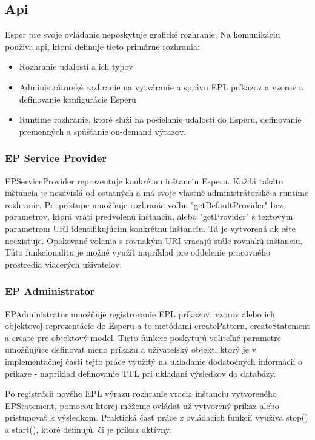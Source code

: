 	\subsection{Api}
		Esper pre svoje ovládanie neposkytuje grafické rozhranie. Na komunikáciu používa api, ktorá definuje tieto primárne rozhrania:
		\begin{itemize}
			\item Rozhranie udalostí a ich typov
			\item Administrátorské rozhranie na vytváranie a správu EPL príkazov a vzorov a definovanie konfigurácie Esperu
			\item Runtime rozhranie, ktoré slúži na posielanie udalostí do Esperu, definovanie premenných a spúšťanie on-demand výrazov.
		\end{itemize}
		
		\subsubsection{EP Service Provider}
		EPServiceProvider reprezentuje konkrétnu inštanciu Esperu. Každá takáto inštancia je nezávislá od ostatných a má svoje vlastné administrátorské a runtime rozhranie. Pri prístupe umožňuje rozhranie voľbu "getDefaultProvider" bez parametrov, ktorá vráti predvolenú inštanciu, alebo "getProvider" s textovým parametrom URI identifikujúcim konkrétnu inštanciu. Tá je vytvorená ak ešte neexistuje. Opakované volania s rovnakým URI vracajú stále rovnakú inštanciu. Túto funkcionalitu je možné využiť napríklad pre oddelenie pracovného prostredia viacerých užívateľov.
		
		\subsubsection{EP Administrator}
		EPAdministrator umožňuje registrovanie EPL príkazov, vzorov alebo ich objektovej reprezentácie do Esperu a to metódami createPattern, createStatement a create pre objektový model. Tieto funkcie poskytujú voliteľné parametre umožňujúce definovať meno príkazu a užívateľský objekt, ktorý je v implementačnej časti tejto práce využitý na ukladanie dodatočných informácií o príkaze - napríklad definovanie TTL pri ukladaní výsledkov do databázy.
		
		Po registrácii nového EPL výrazu rozhranie vracia inštanciu vytvoreného EPStatement, pomocou ktorej môžeme ovládať už vytvorený príkaz alebo pristupovať k výsledkom. Praktická časť práce z ovládacích funkcií využíva stop() a start(), ktoré definujú, či je príkaz aktívny.
		
